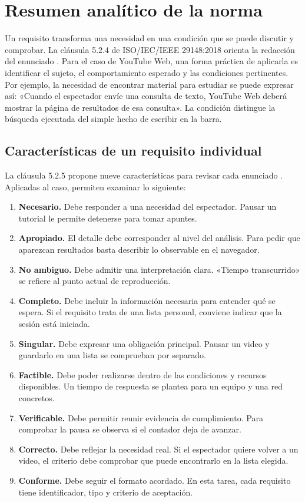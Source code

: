 \documentclass[11pt,a4paper]{article}
\begin{document}
\section{Resumen analítico de la norma}
Un requisito transforma una necesidad en una condición que se puede discutir
y comprobar. La cláusula 5.2.4 de ISO/IEC/IEEE 29148:2018 orienta la
redacción del enunciado \cite[cl. 5.2.4]{ieee29148}. Para el caso de
YouTube Web, una forma práctica de aplicarla es identificar el sujeto, el
comportamiento esperado y las condiciones pertinentes. Por ejemplo, la
necesidad de encontrar material para estudiar se puede expresar así:
«Cuando el espectador envíe una consulta de texto, YouTube Web deberá
mostrar la página de resultados de esa consulta». La condición distingue
la búsqueda ejecutada del simple hecho de escribir en la barra.

\subsection{Características de un requisito individual}
La cláusula 5.2.5 propone nueve características para revisar cada
enunciado \cite[cl. 5.2.5]{ieee29148}. Aplicadas al caso, permiten
examinar lo siguiente:

\begin{enumerate}
\item \textbf{Necesario.} Debe responder a una necesidad del espectador.
Pausar un tutorial le permite detenerse para tomar apuntes.
\item \textbf{Apropiado.} El detalle debe corresponder al nivel del análisis.
Para pedir que aparezcan resultados basta describir lo observable en el navegador.
\item \textbf{No ambiguo.} Debe admitir una interpretación clara.
«Tiempo transcurrido» se refiere al punto actual de reproducción.
\item \textbf{Completo.} Debe incluir la información necesaria para entender
qué se espera. Si el requisito trata de una lista personal, conviene indicar
que la sesión está iniciada.
\item \textbf{Singular.} Debe expresar una obligación principal. Pausar
un video y guardarlo en una lista se comprueban por separado.
\item \textbf{Factible.} Debe poder realizarse dentro de las condiciones y
recursos disponibles. Un tiempo de respuesta se plantea para un equipo y
una red concretos.
\item \textbf{Verificable.} Debe permitir reunir evidencia de cumplimiento.
Para comprobar la pausa se observa si el contador deja de avanzar.
\item \textbf{Correcto.} Debe reflejar la necesidad real. Si el espectador
quiere volver a un video, el criterio debe comprobar que puede encontrarlo
en la lista elegida.
\item \textbf{Conforme.} Debe seguir el formato acordado. En esta tarea,
cada requisito tiene identificador, tipo y criterio de aceptación.
\end{enumerate}
\end{document}
